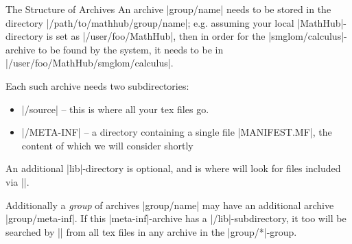 \begin{sfragment}{The Structure of \sTeX Archives}
    An \sTeX archive |group/name| needs to be stored in the
    directory |/path/to/mathhub/group/name|; e.g. assuming your
    local |MathHub|-directory is set as |/user/foo/MathHub|, then
    in order for the |smglom/calculus|-archive to be found by the
    \sTeX system, it needs to be in |/user/foo/MathHub/smglom/calculus|.

    Each such archive needs two subdirectories:
    \begin{itemize}
        \item |/source| -- this is where all your tex files go.
        \item |/META-INF| -- a directory containing a single file
            |MANIFEST.MF|, the content of which we will consider shortly
    \end{itemize}
    An additional |lib|-directory is optional, and is where \sTeX will
    look for files included via |\libinput|.

    Additionally a \emph{group} of archives |group/name| may have
    an additional archive |group/meta-inf|. If this |meta-inf|-archive
    has a |/lib|-subdirectory, it too will be searched by |\libinput|
    from all tex files in any archive in the |group/*|-group.
\end{sfragment}

